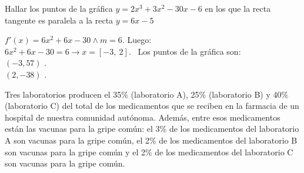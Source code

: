 \documentclass[addpoints,spanish, 12pt,a4paper]{exam}
\begin{document}
\begin{questions}
\begin{solution}
\end{solution}

\question[4] Hallar los puntos de la gráfica $y=2 x^{3} + 3 x^{2} - 30 x - 6$ en los que la recta tangente es paralela a la recta $y=6 x - 5$
\begin{solution}$f'(x)=6 x^{2} + 6 x - 30\land m=6$. Luego: \\ $6 x^{2} + 6 x - 30 = 6 \to x =\left[ -3, \  2\right] $. \ Los puntos de la gráfica son: \\   $\left(-3,57 \right)$ . \\  $\left(2,-38 \right)$ . \\ 
\end{solution}




\question[3] Tres laboratorios producen el 35\% (laboratorio A), 25\% (laboratorio B) y 40\% (laboratorio C) del total
de los medicamentos que se reciben en la farmacia de un hospital de nuestra comunidad autónoma.
Además, entre esos medicamentos están las vacunas para la gripe común: el 3\% de los
medicamentos del laboratorio A son vacunas para la gripe común, el 2\% de los medicamentos del
laboratorio B son vacunas para la gripe común y el 2\% de los medicamentos del laboratorio C son
vacunas para la gripe común.


\end{questions}
\end{document}
